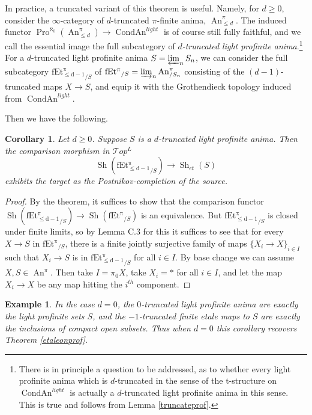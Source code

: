 \documentclass[12pt]{article}
\newtheorem{corollary}[theorem]{Corollary}
\newtheorem{example}[theorem]{Example}
\newcommand{\on}{\operatorname}
\begin{document}
In practice, a truncated variant of this theorem is useful.  Namely, for $d\geq 0$, consider the $\infty$-category of $d$-truncated $\pi$-finite anima, $\on{An}^\pi_{\leq d}$.  The induced functor $\on{Pro}^{\aleph_0}(\on{An}^\pi_{\leq d})\rightarrow \on{CondAn}^{light}$ is of course still fully faithful, and we call the essential image the full subcategory of \emph{$d$-truncated light profinite anima}.\footnote{There is in principle a question to be addressed, as to whether every light profinite anima which is $d$-truncated in the sense of the t-structure on $\on{CondAn}^{light}$ is actually a $d$-truncated light profinite anima in this sense.  This is true and follows from Lemma \ref{truncateprof}.}
For a $d$-truncated light profinite anima $S=\varprojlim_n S_n$, we can consider the full subcategory $\on{fEt^\pi_{\leq d-1}}_{/S}$ of $\on{fEt^\pi}_{/S}=\varinjlim_n \on{An}^\pi_{/S_n}$ consisting of the $(d-1)$-truncated maps $X\rightarrow S$, and equip it with the Grothendieck topology induced from $\on{CondAn}^{light}$.

Then we have the following.

\begin{corollary}\label{truncatedcorollary}
Let $d\geq 0$.  Suppose $S$ is a $d$-truncated light profinite anima.  Then the comparison morphism in $\mathcal{T}op^L$
$$\on{Sh}(\on{fEt^\pi_{\leq d-1}}_{/S})\rightarrow \on{Sh}_{et}(S)$$
exhibits the target as the Postnikov-completion of the source.
\end{corollary}
\begin{proof}
By the theorem, it suffices to show that the comparison functor $\on{Sh}(\on{fEt^\pi_{\leq d-1}}_{/S})\rightarrow \on{Sh}(\on{fEt^\pi}_{/S})$ is an equivalence.  But $\on{fEt^\pi_{\leq d-1}}_{/S}$ is closed under finite limits, so by \cite{HoyoisLefschetz} Lemma C.3 for this it suffices to see that for every $X\rightarrow S$ in $\on{fEt^\pi}_{/S}$, there is a finite jointly surjective family of maps $\{X_i\rightarrow X\}_{i\in I}$ such that $X_i\rightarrow S$ is in $\on{fEt^\pi_{\leq d-1}}_{/S}$ for all $i\in I$.  By base change we can assume $X,S\in \on{An}^\pi$.  Then take $I=\pi_0X$, take $X_i=\ast$ for all $i\in I$, and let the map $X_i\rightarrow X$ be any map hitting the $i^{th}$ component.
\end{proof}

\begin{example}
In the case $d=0$, the $0$-truncated light profinite anima are exactly the light profinite sets $S$, and the $-1$-truncated finite etale maps to $S$ are exactly the inclusions of compact open subsets.  Thus when $d=0$ this corollary recovers Theorem \ref{etaleonprof}.
\end{example}
\end{document}
